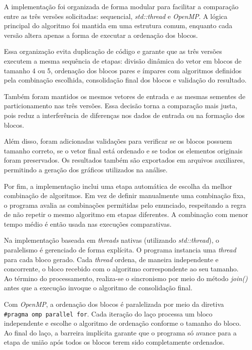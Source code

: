 A implementação foi organizada de forma modular para facilitar a comparação entre as três versões solicitadas: sequencial, \textit{std::thread} e \textit{OpenMP}. A lógica principal do algoritmo foi mantida em uma estrutura comum, enquanto cada versão altera apenas a forma de executar a ordenação dos blocos.

\indent Essa organização evita duplicação de código e garante que as três versões executem a mesma sequência de etapas: divisão dinâmica do vetor em blocos de tamanho 4 ou 5, ordenação dos blocos pares e ímpares com algoritmos definidos pela combinação escolhida, consolidação final dos blocos e validação do resultado.

\indent Também foram mantidos os mesmos vetores de entrada e as mesmas sementes de particionamento nas três versões. Essa decisão torna a comparação mais justa, pois reduz a interferência de diferenças nos dados de entrada ou na formação dos blocos.

\indent Além disso, foram adicionadas validações para verificar se os blocos possuem tamanho correto, se o vetor final está ordenado e se todos os elementos originais foram preservados. Os resultados também são exportados em arquivos auxiliares, permitindo a geração dos gráficos utilizados na análise.

\indent Por fim, a implementação inclui uma etapa automática de escolha da melhor combinação de algoritmos. Em vez de definir manualmente uma combinação fixa, o programa avalia as combinações permitidas pelo enunciado, respeitando a regra de não repetir o mesmo algoritmo em etapas diferentes. A combinação com menor tempo médio é então usada nas execuções comparativas.

Na implementação baseada em \textit{threads} nativas (utilizando \textit{std::thread}), o paralelismo é gerenciado de forma explícita. O programa instancia uma \textit{thread} para cada bloco gerado. Cada \textit{thread} ordena, de maneira independente e concorrente, o bloco recebido com o algoritmo correspondente ao seu tamanho. Ao término do processamento, realiza-se o sincronismo por meio do método \textit{join()} antes que a execução invoque o algoritmo de consolidação final.


\indent Com \textit{OpenMP}, a ordenação dos blocos é paralelizada por meio da diretiva \texttt{\#pragma omp parallel for}. Cada iteração do laço processa um bloco independente e escolhe o algoritmo de ordenação conforme o tamanho do bloco. Ao final do laço, a barreira implícita garante que o programa só avance para a etapa de união após todos os blocos terem sido completamente ordenados.


